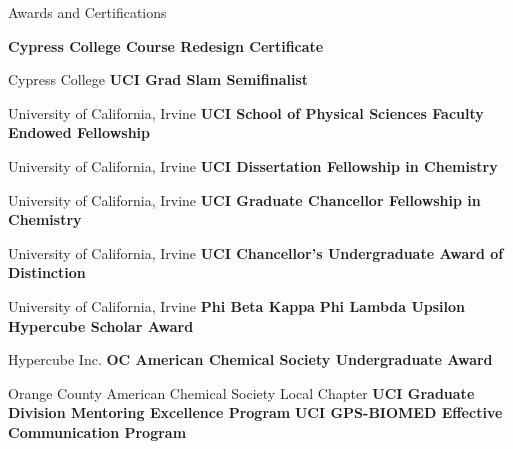 \begin{rubric}{Awards and Certifications}

  \entry*[Feb 2023] \textbf{Cypress College Course Redesign Certificate}
  
  Cypress College
  \entry*[Feb 2022] \textbf{UCI Grad Slam Semifinalist}
  
  University of California, Irvine
  \entry*[Jun 2021] \textbf{UCI School of Physical Sciences Faculty Endowed Fellowship}

  University of California, Irvine
  \entry*[Jun 2021] \textbf{UCI Dissertation Fellowship in Chemistry}
  
  University of California, Irvine
  \entry*[Sept 2016] \textbf{UCI Graduate Chancellor Fellowship in Chemistry}
  
  University of California, Irvine
  \entry*[Jun 2015] \textbf{UCI Chancellor's Undergraduate Award of Distinction}
  
  University of California, Irvine
  \entry*[May 2015] \textbf{Phi Beta Kappa}
  \entry*[May 2015] \textbf{Phi Lambda Upsilon}
  \entry*[Jun 2014] \textbf{Hypercube Scholar Award}
  
  Hypercube Inc.
  \entry*[Apr 2014] \textbf{OC American Chemical Society Undergraduate Award}
  
  Orange County American Chemical Society Local Chapter
  \entry*[Mar 2020] \textbf{UCI Graduate Division Mentoring Excellence Program}
  \entry*[Jun 2017] \textbf{UCI GPS-BIOMED Effective Communication Program} 
\end{rubric}
